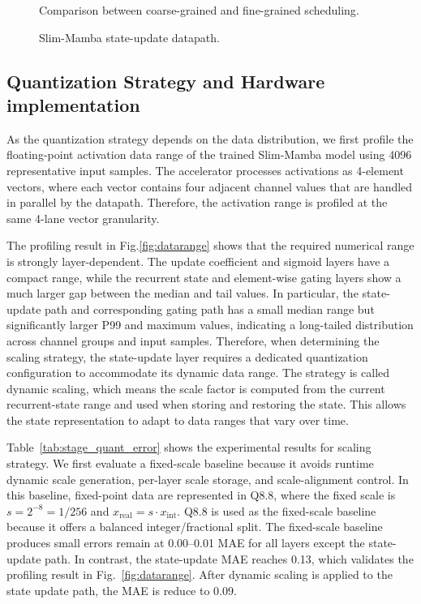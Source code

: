 \documentclass[lettersize,journal]{IEEEtran}
\begin{document}
\begin{figure}[!t]
\centering

\caption{Comparison between coarse-grained and fine-grained scheduling.}
\label{fig:fine_grained_pipeline}
\end{figure}

\begin{figure}[!t]
\centering

\caption{Slim-Mamba state-update datapath.}
\label{fig:ssm_path}
\end{figure}

\subsection{Quantization Strategy and Hardware implementation}

As the quantization strategy depends on the data distribution, we first profile the floating-point
activation data range of the trained Slim-Mamba model using 4096 representative
input samples. The accelerator processes activations as 4-element vectors, where each vector
contains four adjacent channel values that are handled in parallel by the
datapath. Therefore, the activation range is profiled at the same 4-lane vector
granularity. 

The profiling result in Fig.\ref{fig:datarange} shows that the required numerical range is strongly
layer-dependent. The update coefficient and sigmoid layers have a compact range,
while the recurrent state and element-wise gating layers show a much larger gap
between the median and tail values. In particular, the state-update path and corresponding gating path has a
small median range but significantly larger P99 and maximum values, indicating a
long-tailed distribution across channel groups and input samples. Therefore, when determining the scaling strategy, the state-update layer requires
a dedicated quantization configuration to accommodate its dynamic data range. The strategy is called dynamic scaling, which means the scale factor is computed from the current recurrent-state range and used when storing and restoring the state. This allows the state representation to adapt to data ranges that vary over
time.

Table~\ref{tab:stage_quant_error} shows the experimental results for scaling strategy. We first evaluate a fixed-scale baseline because it avoids runtime dynamic scale
generation, per-layer scale storage, and scale-alignment control. In this baseline, fixed-point data are represented in Q8.8,
where the fixed scale is \(s=2^{-8}=1/256\) and
\(x_{\mathrm{real}}=s\cdot x_{\mathrm{int}}\). Q8.8 is used as the fixed-scale baseline because it 
offers a balanced integer/fractional split.
The fixed-scale baseline produces small errors remain at 0.00--0.01 MAE for all layers except the
state-update path. In contrast, the state-update MAE reaches
0.13, which validates the profiling result in Fig.~\ref{fig:datarange}. After dynamic scaling is applied to the state update path, the
MAE is reduce to 0.09. 
\end{document}
